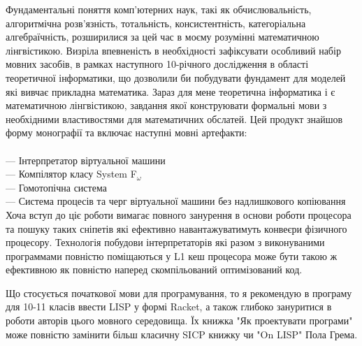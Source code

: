Фундаментальні поняття комп'ютерних наук, такі як обчислювальність,
алгоритмічна розв'язність, тотальність, консистентність,
категоріальна алгебраїчність, розширилися за цей час в моєму
розумінні математичною лінгвістикою. Визріла впевненість в
необхідності зафіксувати особливий набір мовних засобів, в
рамках наступного 10-річного дослідження в області теоретичної
інформатики, що дозволили би побудувати фундамент для моделей
які вивчає прикладна математика. Зараз для мене теоретична
інформатика і є математичною лінгвістикою, завдання якої
конструювати формальні мови з необхідними властивостями для
математичних обслатей. Цей продукт знайшов форму монографії
та включає наступні мовні артефакти:
\\
\\
\noindent--- Інтерпретатор віртуальної машини\\
--- Компілятор класу System F$_\omega$\\
--- Гомотопічна система\\
--- Система процесів та черг віртуальної машини без надлишкового копіювання\\

Хоча вступ до ціє роботи вимагає повного занурення в основи
роботи процесора та пошуку таких сніпетів які ефективно
навантажуватимуть конвеєри фізичного процесору. Технологія
побудови інтерпретаторів які разом з виконуваними программами
повністю поміщаються у L1 кеш процесора може бути такою ж
ефективною як повністю наперед скомпільований оптимізований код.

Що стосується початкової мови для програмування, то я рекомендую
в програму для 10-11 класів ввести LISP у формі Racket, а також
глибоко зануритися в роботи авторів цього мовного середовища.
Їх книжка "Як проектувати програми" може повністю замінити
більш класичну SICP книжку чи "On LISP" Пола Грема.

